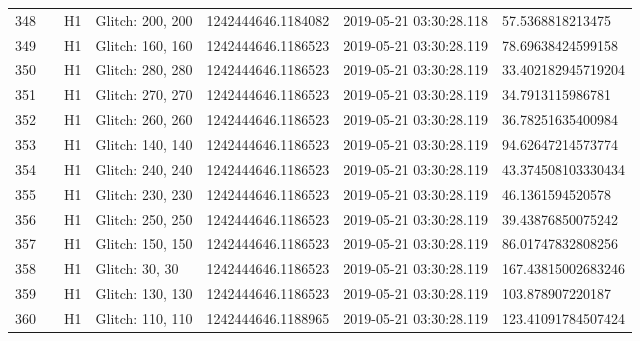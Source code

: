 \begin{longtable}{lllllll}
348  &                                                    &       H1 &  Glitch: 200, 200 &  1242444646.1184082 &  2019-05-21 03:30:28.118 &    57.5368818213475 \\
349  &                                                    &       H1 &  Glitch: 160, 160 &  1242444646.1186523 &  2019-05-21 03:30:28.119 &   78.69638424599158 \\
350  &                                                    &       H1 &  Glitch: 280, 280 &  1242444646.1186523 &  2019-05-21 03:30:28.119 &  33.402182945719204 \\
351  &                                                    &       H1 &  Glitch: 270, 270 &  1242444646.1186523 &  2019-05-21 03:30:28.119 &    34.7913115986781 \\
352  &                                                    &       H1 &  Glitch: 260, 260 &  1242444646.1186523 &  2019-05-21 03:30:28.119 &   36.78251635400984 \\
353  &                                                    &       H1 &  Glitch: 140, 140 &  1242444646.1186523 &  2019-05-21 03:30:28.119 &   94.62647214573774 \\
354  &                                                    &       H1 &  Glitch: 240, 240 &  1242444646.1186523 &  2019-05-21 03:30:28.119 &  43.374508103330434 \\
355  &                                                    &       H1 &  Glitch: 230, 230 &  1242444646.1186523 &  2019-05-21 03:30:28.119 &    46.1361594520578 \\
356  &                                                    &       H1 &  Glitch: 250, 250 &  1242444646.1186523 &  2019-05-21 03:30:28.119 &   39.43876850075242 \\
357  &                                                    &       H1 &  Glitch: 150, 150 &  1242444646.1186523 &  2019-05-21 03:30:28.119 &   86.01747832808256 \\
358  &                                                    &       H1 &    Glitch: 30, 30 &  1242444646.1186523 &  2019-05-21 03:30:28.119 &  167.43815002683246 \\
359  &                                                    &       H1 &  Glitch: 130, 130 &  1242444646.1186523 &  2019-05-21 03:30:28.119 &    103.878907220187 \\
360  &                                                    &       H1 &  Glitch: 110, 110 &  1242444646.1188965 &  2019-05-21 03:30:28.119 &  123.41091784507424 \\

\end{longtable}
